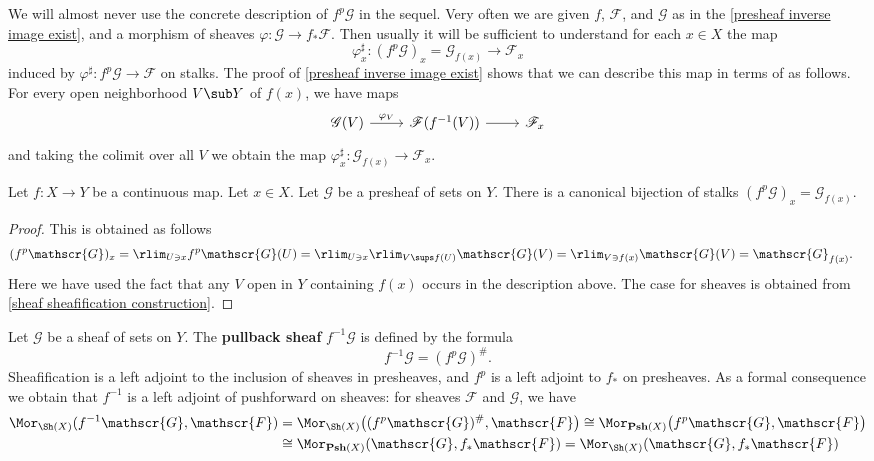 \begin{remark}
We will almost never use the concrete description of $f^{p}\mathscr{G}$ in the sequel. Very often we are given $f$, $\mathscr{F}$, and $\mathscr{G}$ as in the \cref{presheaf inverse image exist}, and a morphism of sheaves $\varphi:\mathscr{G}\to f_*\mathscr{F}$. Then usually it will be sufficient to understand for each $x\in X$ the map
\[\varphi^{\sharp}_x:(f^{p}\mathscr{G})_x=\mathscr{G}_{f(x)}\to\mathscr{F}_x\]
induced by $\varphi^{\sharp}:f^{p}\mathscr{G}\to\mathscr{F}$ on stalks. The proof of \cref{presheaf inverse image exist} shows that we can describe this map in terms of as follows. For every open neighborhood $V\sub Y$ of $f(x)$, we have maps
\[\begin{tikzcd}
\mathscr{G}(V)\ar[r,"\varphi_V"]&\mathscr{F}(f^{-1}(V))\ar[r]&\mathscr{F}_x
\end{tikzcd}\]
and taking the colimit over all $V$ we obtain the map $\varphi^{\sharp}_x:\mathscr{G}_{f(x)}\to\mathscr{F}_x$.
\end{remark}
\begin{proposition}\label{pull back stalk}
Let $f:X\to Y$ be a continuous map. Let $x\in X$. Let $\mathscr{G}$ be a presheaf of sets on $Y$. There is a canonical bijection of stalks $(f^{p}\mathscr{G})_x=\mathscr{G}_{f(x)}$.
\end{proposition}
\begin{proof}
This is obtained as follows
\begin{align*}
(f^{p}\mathscr{G})_x&=\rlim_{U\ni x}f^{p}\mathscr{G}(U)=\rlim_{U\ni x}\rlim_{V\sups f(U)}\mathscr{G}(V)=\rlim_{V\ni f(x)}\mathscr{G}(V)=\mathscr{G}_{f(x)}.
\end{align*}
Here we have used the fact that any $V$ open in $Y$ containing $f(x)$ occurs in the description above. The case for sheaves is obtained from \cref{sheaf sheafification construction}.
\end{proof}
Let $\mathscr{G}$ be a sheaf of sets on $Y$. The \textbf{pullback sheaf} $f^{-1}\mathscr{G}$ is defined by the formula
\[f^{-1}\mathscr{G}=(f^{p}\mathscr{G})^{\#}.\]
Sheafification is a left adjoint to the inclusion of sheaves in presheaves, and $f^{p}$ is a left adjoint to $f_*$ on presheaves. As a formal consequence we obtain that $f^{-1}$ is a left adjoint of pushforward on sheaves: for sheaves $\mathscr{F}$ and $\mathscr{G}$, we have
\begin{align*}
\Mor_{\Sh(X)}(f^{-1}\mathscr{G},\mathscr{F})&=\Mor_{\Sh(X)}\big((f^{p}\mathscr{G})^{\#},\mathscr{F}\big)\cong\Mor_{\mathbf{Psh}(X)}\big(f^{p}\mathscr{G},\mathscr{F}\big)\\
&\cong\Mor_{\mathbf{Psh}(X)}(\mathscr{G},f_*\mathscr{F})=\Mor_{\Sh(X)}(\mathscr{G},f_*\mathscr{F})
\end{align*}
